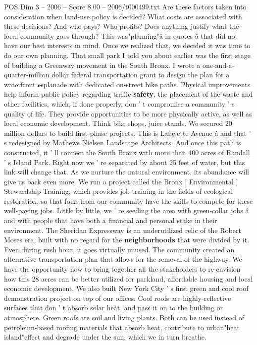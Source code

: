 \begin{textsample}{POS Dim 3 – 2006 – Score 8.00 – 2006/t000499.txt}
Are these factors taken into consideration when land-use policy is decided?
What costs are associated with these decisions?
And who pays?
Who profits?
Does anything justify what the local community goes through?
This was"planning"â in quotes â that did not have our best interests in mind.
Once we realized that, we decided it was time to do our own planning.
That small park I told you about earlier was the first stage of building a Greenway movement in the South Bronx.
I wrote a one-and-a-quarter-million dollar federal transportation grant to design the plan for a waterfront esplanade with dedicated on-street bike paths.
Physical improvements help inform public policy regarding traffic \textbf{safety}, the placement of the waste and other facilities, which, if done properly, don ' t compromise a community ' s quality of life.
They provide opportunities to be more physically active, as well as local economic development.
Think bike shops, juice stands.
We secured 20 million dollars to build first-phase projects.
This is Lafayette Avenue â and that ' s redesigned by Mathews Nielsen Landscape Architects.
And once this path is constructed, it ' ll connect the South Bronx with more than 400 acres of Randall ' s Island Park.
Right now we ' re separated by about 25 feet of water, but this link will change that.
As we nurture the natural environment, its abundance will give us back even more.
We run a project called the Bronx [ Environmental ] Stewardship Training, which provides job training in the fields of ecological restoration, so that folks from our community have the skills to compete for these well-paying jobs.
Little by little, we ' re seeding the area with green-collar jobs â and with people that have both a financial and personal stake in their environment.
The Sheridan Expressway is an underutilized relic of the Robert Moses era, built with no regard for the \textbf{neighborhoods} that were divided by it.
Even during rush hour, it goes virtually unused.
The community created an alternative transportation plan that allows for the removal of the highway.
We have the opportunity now to bring together all the stakeholders to re-envision how this 28 acres can be better utilized for parkland, affordable housing and local economic development.
We also built New York City ' s first green and cool roof demonstration project on top of our offices.
Cool roofs are highly-reflective surfaces that don ' t absorb solar heat, and pass it on to the building or atmosphere.
Green roofs are soil and living plants.
Both can be used instead of petroleum-based roofing materials that absorb heat, contribute to urban"heat island"effect and degrade under the sun, which we in turn breathe.

\end{textsample}

